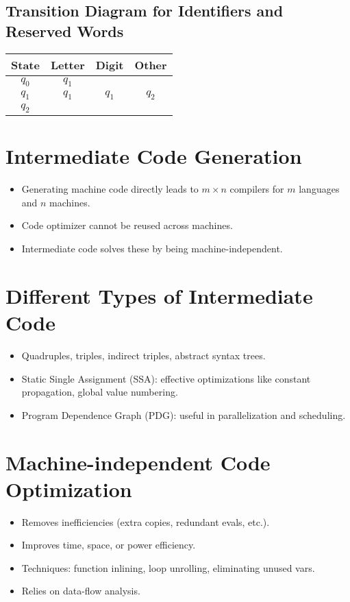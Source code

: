 \documentclass[12pt,a4paper]{article}
\begin{document}
\subsection*{Transition Diagram for Identifiers and Reserved Words}
\begin{center}
\begin{tabular}{|c|c|c|c|}
\hline
State & Letter & Digit & Other \\
\hline
$q_0$ & $q_1$ & & \\
$q_1$ & $q_1$ & $q_1$ & $q_2$ \\
$q_2$ & & & \\
\hline
\end{tabular}
\end{center}

\section*{Intermediate Code Generation}
\begin{itemize}
    \item Generating machine code directly leads to $m \times n$ compilers for $m$ languages and $n$ machines.
    \item Code optimizer cannot be reused across machines.
    \item Intermediate code solves these by being machine-independent.
\end{itemize}

\section*{Different Types of Intermediate Code}
\begin{itemize}
    \item Quadruples, triples, indirect triples, abstract syntax trees.
    \item Static Single Assignment (SSA): effective optimizations like constant propagation, global value numbering.
    \item Program Dependence Graph (PDG): useful in parallelization and scheduling.
\end{itemize}

\section*{Machine-independent Code Optimization}
\begin{itemize}
    \item Removes inefficiencies (extra copies, redundant evals, etc.).
    \item Improves time, space, or power efficiency.
    \item Techniques: function inlining, loop unrolling, eliminating unused vars.
    \item Relies on data-flow analysis.
\end{itemize}
\end{document}
